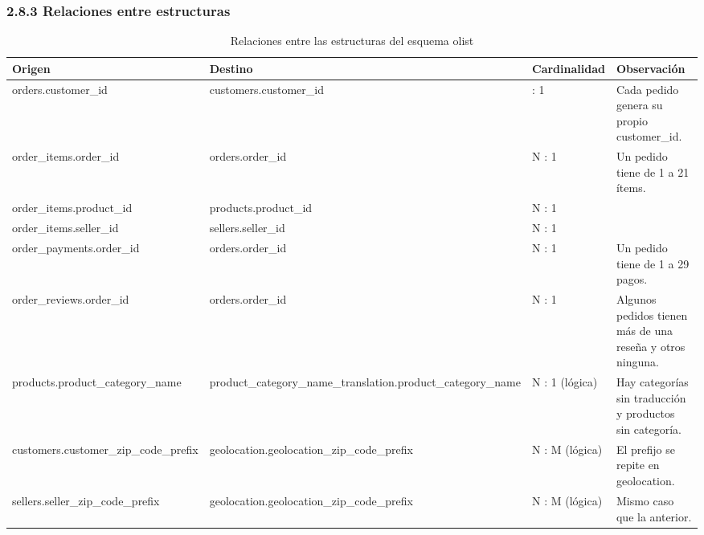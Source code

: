 \documentclass[a4paper,stu,12pt,donotrepeattitle,floatsintext]{apa7}
\begin{document}
\subsubsection{2.8.3 Relaciones entre estructuras}
{\footnotesize
\begin{longtable}{|>{\raggedright\arraybackslash}p{}|>{\raggedright\arraybackslash}p{}|>{\raggedright\arraybackslash}p{}|>{\raggedright\arraybackslash}p{}|}
\caption{Relaciones entre las estructuras del esquema olist}\\
\hline
\textbf{Origen} & \textbf{Destino} & \textbf{Cardinalidad} & \textbf{Observación} \\ \hline
\endhead
orders.customer\_\allowbreak{}id & customers.customer\_\allowbreak{}id & 1 : 1 & Cada pedido genera su propio customer\_\allowbreak{}id. \\ \hline
order\_\allowbreak{}items.order\_\allowbreak{}id & orders.order\_\allowbreak{}id & N : 1 & Un pedido tiene de 1 a 21 ítems. \\ \hline
order\_\allowbreak{}items.product\_\allowbreak{}id & products.product\_\allowbreak{}id & N : 1 &  \\ \hline
order\_\allowbreak{}items.seller\_\allowbreak{}id & sellers.seller\_\allowbreak{}id & N : 1 &  \\ \hline
order\_\allowbreak{}payments.order\_\allowbreak{}id & orders.order\_\allowbreak{}id & N : 1 & Un pedido tiene de 1 a 29 pagos. \\ \hline
order\_\allowbreak{}reviews.order\_\allowbreak{}id & orders.order\_\allowbreak{}id & N : 1 & Algunos pedidos tienen más de una reseña y otros ninguna. \\ \hline
products.product\_\allowbreak{}category\_\allowbreak{}name & product\_\allowbreak{}category\_\allowbreak{}name\_\allowbreak{}translation.product\_\allowbreak{}category\_\allowbreak{}name & N : 1 (lógica) & Hay categorías sin traducción y productos sin categoría. \\ \hline
customers.customer\_\allowbreak{}zip\_\allowbreak{}code\_\allowbreak{}prefix & geolocation.geolocation\_\allowbreak{}zip\_\allowbreak{}code\_\allowbreak{}prefix & N : M (lógica) & El prefijo se repite en geolocation. \\ \hline
sellers.seller\_\allowbreak{}zip\_\allowbreak{}code\_\allowbreak{}prefix & geolocation.geolocation\_\allowbreak{}zip\_\allowbreak{}code\_\allowbreak{}prefix & N : M (lógica) & Mismo caso que la anterior. \\ \hline
\end{longtable}
}
\end{document}
